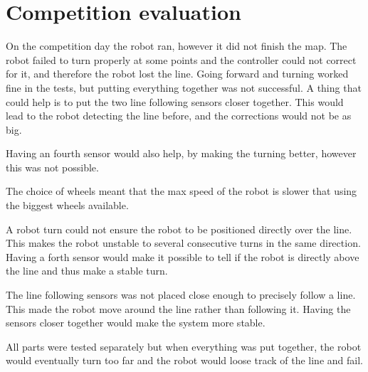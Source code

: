\section{Competition evaluation}
On the competition day the robot ran, however it did not finish the map.
The robot failed to turn properly at some points and the controller could not correct for it, and therefore the robot lost the line.
Going forward and turning worked fine in the tests, but putting everything together was not successful.
A thing that could help is to put the two line following sensors closer together.
This would lead to the robot detecting the line before, and the corrections would not be as big. 

Having an fourth sensor would also help, by making the turning better, however this was not possible.

The choice of wheels meant that the max speed of the robot is slower that using the biggest wheels available.

A robot turn could not ensure the robot to be positioned directly over the line.
This makes the robot unstable to several consecutive turns in the same direction.
Having a forth sensor would make it possible to tell if the robot is directly above the line and thus make a stable turn.

The line following sensors was not placed close enough to precisely follow a line.
This made the robot move around the line rather than following it.
Having the sensors closer together would make the system more stable.

All parts were tested separately but when everything was put together, the robot would eventually turn too far and the robot would loose track of the line and fail.
